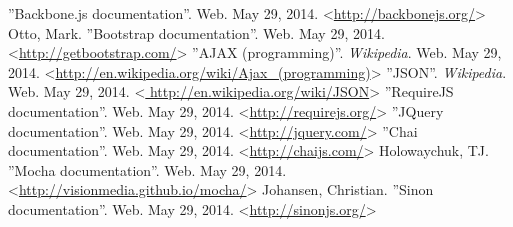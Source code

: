  ''Backbone.js documentation''. Web. May 29, 2014. <\url{http://backbonejs.org/}>
 Otto, Mark. ''Bootstrap documentation''. Web. May 29, 2014. <\url{http://getbootstrap.com/}> 
 ''AJAX (programming)''. \textit{Wikipedia}. Web. May 29, 2014. <\url{http://en.wikipedia.org/wiki/Ajax_(programming)}> 
 ''JSON''. \textit{Wikipedia}. Web. May 29, 2014. <\url{ http://en.wikipedia.org/wiki/JSON}> 
 ''RequireJS documentation''. Web. May 29, 2014. <\url{http://requirejs.org/}>
 ''JQuery documentation''. Web. May 29, 2014. <\url{http://jquery.com/}>
 ''Chai documentation''. Web. May 29, 2014. <\url{http://chaijs.com/}>
 Holowaychuk, TJ. ''Mocha documentation''. Web. May 29, 2014. <\url{http://visionmedia.github.io/mocha/}> 
 Johansen, Christian. ''Sinon documentation''. Web. May 29, 2014. <\url{http://sinonjs.org/}>
